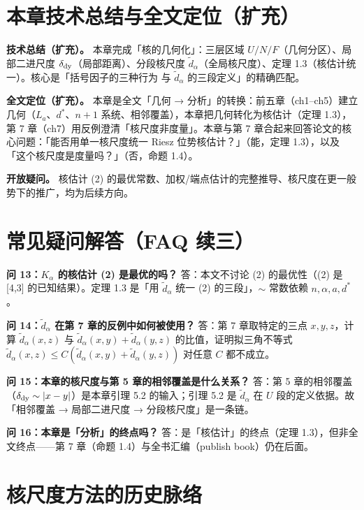 \documentclass[a4paper,11pt,openany]{ctexbook}
\numberwithin{equation}{chapter}
\numberwithin{figure}{chapter}
\numberwithin{table}{chapter}
\begin{document}
\section{本章技术总结与全文定位（扩充）}

\textbf{技术总结（扩充）。} 本章完成「核的几何化」：三层区域 $U/N/F$（几何分区）、局部二进尺度 $\delta_{\rm dy}$（局部距离）、分段核尺度 $\widetilde d_\alpha$（全局核尺度）、定理 1.3（核估计统一）。核心是「括号因子的三种行为 与 $\widetilde d_\alpha$ 的三段定义」的精确匹配。

\textbf{全文定位（扩充）。} 本章是全文「几何 → 分析」的转换：前五章（ch1–ch5）建立几何（$L_a$、$d^*$、$n+1$ 系统、相邻覆盖），本章把几何转化为核估计（定理 1.3），第 7 章（ch7）用反例澄清「核尺度非度量」。本章与第 7 章合起来回答论文的核心问题：「能否用单一核尺度统一 Riesz 位势核估计？」（能，定理 1.3），以及「这个核尺度是度量吗？」（否，命题 1.4）。

\textbf{开放疑问。} 核估计 (2) 的最优常数、加权/端点估计的完整推导、核尺度在更一般势下的推广，均为后续方向。

\section{常见疑问解答（FAQ 续三）}

\textbf{问 13：$K_\alpha$ 的核估计 (2) 是最优的吗？} 答：本文不讨论 (2) 的最优性（(2) 是 [4,3] 的已知结果）。定理 1.3 是「用 $\widetilde d_\alpha$ 统一 (2) 的三段」，$\sim$ 常数依赖 $n,\alpha,a,d^*$。

\textbf{问 14：$\widetilde d_\alpha$ 在第 7 章的反例中如何被使用？} 答：第 7 章取特定的三点 $x,y,z$，计算 $\widetilde d_\alpha(x,z)$ 与 $\widetilde d_\alpha(x,y)+\widetilde d_\alpha(y,z)$ 的比值，证明拟三角不等式 $\widetilde d_\alpha(x,z)\le C(\widetilde d_\alpha(x,y)+\widetilde d_\alpha(y,z))$ 对任意 $C$ 都不成立。

\textbf{问 15：本章的核尺度与第 5 章的相邻覆盖是什么关系？} 答：第 5 章的相邻覆盖（$\delta_{\rm dy}\sim|x-y|$）是本章引理 5.2 的输入；引理 5.2 是 $\widetilde d_\alpha$ 在 $U$ 段的定义依据。故「相邻覆盖 → 局部二进尺度 → 分段核尺度」是一条链。

\textbf{问 16：本章是「分析」的终点吗？} 答：是「核估计」的终点（定理 1.3），但非全文终点——第 7 章（命题 1.4）与全书汇编（publish book）仍在后面。

\section{核尺度方法的历史脉络}
\end{document}
